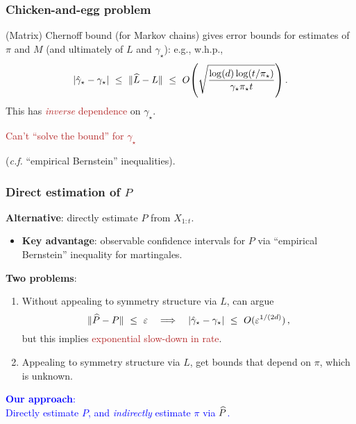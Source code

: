 \documentclass[11pt,compress,blue4]{beamer}
\newcommand{\BLUE}[1]{\textcolor{blue}{#1}}
\newcommand{\FIREBRICK}[1]{\textcolor{firebrick}{#1}}
\newcommand\fns\footnotesize
\newcommand\pimin{\ensuremath{\pi_{\star}}}
\newcommand\gap{\ensuremath{\gamma_{\star}}}
\newcommand\gaphat{\ensuremath{\hat{\gamma}_{\star}}}
\begin{document}

\begin{frame}
  \frametitle{Chicken-and-egg problem}

  (Matrix) Chernoff bound {\fns(for Markov chains)} gives error bounds
  for estimates of $\pi$ and $M$ (and ultimately of $L$ and $\gap$):
  e.g., w.h.p.,
  \[
    \abs{\gaphat-\gap}
    \ \leq \
    \norm{\wh L - L}
    \ \leq \
    O\Parens{
      \sqrt{\frac{\log(d)\log(t/\pimin)}{\gap\pimin t}}
    }
    \,.
  \]
  \onslide<2->
  This has \FIREBRICK{\emph{inverse} dependence} on $\gap$.

  \begin{center}
    \FIREBRICK{%
      Can't ``solve the bound'' for $\gap$
    }

    {\fns(\emph{c.f.} ``empirical Bernstein'' inequalities)}.
  \end{center}

\end{frame}


\begin{frame}
  \frametitle{Direct estimation of $P$}

  \textbf{Alternative}: directly estimate $P$ from $X_{1:t}$.

  \begin{itemize}
    \item<2->
      \textbf{Key advantage}: observable confidence intervals for $P$
      via ``empirical Bernstein'' inequality for martingales.

  \end{itemize}

  \textbf{Two problems}:
  \begin{enumerate}
    \item<4->
      Without appealing to symmetry structure via $L$, can argue
      \[
        \norm{\wh{P} - P} \ \leq \ \veps
        \quad\Longrightarrow\quad
        \abs{\gaphat - \gap} \ \leq \ O(\veps^{1/(2d)})
        \,,
      \]
      but this implies \FIREBRICK{exponential slow-down in rate}.

      \medskip

    \item<5->
      Appealing to symmetry structure via $L$, get bounds that depend
      on $\pi$, which is unknown.

  \end{enumerate}

  \begin{center}
    \BLUE{%
      \textbf{Our approach}: \\
      Directly estimate $P$, and \emph{indirectly} estimate $\pi$ via
      $\widehat P$.
    }
  \end{center}

\end{frame}
\end{document}
